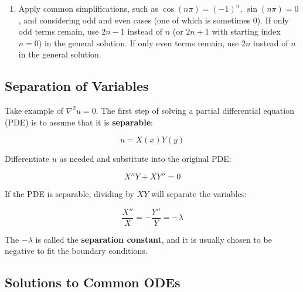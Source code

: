 \begin{enumerate}
          \begin{equation*}
              u(x, t) = v(x, t) + u_f(x)\text{,}
          \end{equation*}

          where $u_f(x)$ is the \textbf{steady-state solution} and $v(x,t)$ is the \textbf{transient solution}, solve for $v(x, t)$ with homogenous boundary conditions and initial condition $v(x, 0) = u(x, 0) - u_f(x)$.
    \item Apply common simplifications, such as $\cos(n\pi) = (-1)^n$, $\sin(n\pi) = 0$, and considering odd and even cases (one of which is sometimes 0). If only odd terms remain, use $2n - 1$ instead of $n$ (or $2n + 1$ with starting index $n = 0$) in the general solution. If only even terms remain, use $2n$ instead of $n$ in the general solution.

\end{enumerate}

\subsection{Separation of Variables}

Take example of $\nabla^2 u = 0$. The first step of solving a partial differential equation (PDE) is to assume that it is \textbf{separable}:

\begin{equation*}
    u = X(x)Y(y)
\end{equation*}

Differentiate $u$ as needed and substitute into the original PDE:

\begin{equation*}
    X''Y + XY'' = 0
\end{equation*}

If the PDE is separable, dividing by $XY$ will separate the variables:

\begin{equation*}
    \frac{X''}{X} = -\frac{Y''}{Y} = -\lambda
\end{equation*}

The $-\lambda$ is called the \textbf{separation constant}, and it is usually chosen to be negative to fit the boundary conditions.

\subsection{Solutions to Common ODEs}

